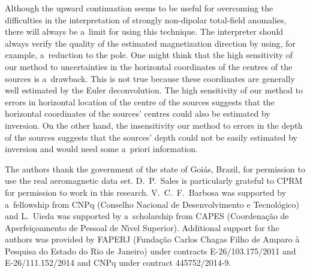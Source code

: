 \documentclass[journal abbreviation, npg]{copernicus}
\begin{document}
Although the upward continuation seems to be useful for overcoming the
difficulties in the interpretation of strongly non-dipolar total-field
anomalies, there will always be a~limit for using this technique. The
interpreter should always verify the quality of the estimated magnetization
direction by using, for example, a~reduction to the pole. One might think
that the high sensitivity of our method to uncertainties in the horizontal
coordinates of the centres of the sources is a~drawback. This is not true
because these coordinates are generally well estimated by the Euler
deconvolution. The high sensitivity of our method to errors in horizontal
location of the centre of the sources suggests that the horizontal
coordinates of the sources' centres could also be estimated by inversion. On
the other hand, the insensitivity our method to errors in the depth of the
sources suggests that the sources' depth could not be easily estimated by
inversion and would need some a~priori information.

\begin{acknowledgements}
  The authors thank the government of the state of Goi\'{a}s, Brazil,
  for permission to use the real aeromagnetic data set. D.~P.~Sales is
  particularly grateful to CPRM for permission to work in this
  research.  V.~C.~F.~Barbosa was supported by a~fellowship from CNPq
  (Conselho Nacional de Desenvolvimento e Tecnol\'{o}gico) and
  L.~Uieda was supported by a~scholarship from CAPES
  (Coordena\c{c}\~{a}o de Aperfei\c{c}oamento de Pessoal de N\'{\i}vel
  Superior). Additional support for the authors was provided by FAPERJ
  (Funda\c{c}\~{a}o Carlos Chagas Filho de Amparo \`{a} Pesquisa do
  Estado do Rio de Janeiro) under contracts E-26/103.175/2011 and
  E-26/111.152/2014 and CNPq under contract 445752/2014-9.
\end{acknowledgements}




\clearpage
\end{document}
